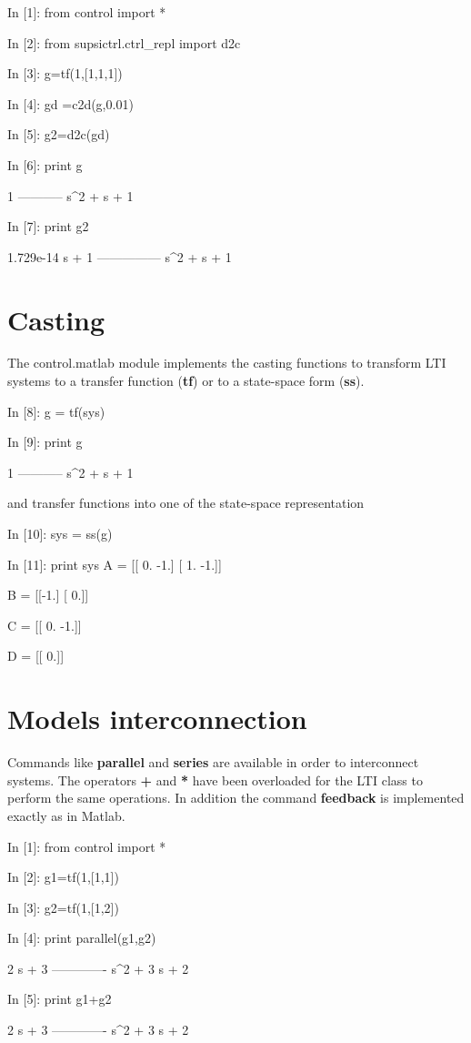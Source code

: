 \begin{code}
In [1]: from control import *

In [2]: from supsictrl.ctrl_repl import d2c

In [3]: g=tf(1,[1,1,1])

In [4]: gd =c2d(g,0.01)

In [5]: g2=d2c(gd)

In [6]: print g

     1
-----------
s^2 + s + 1


In [7]: print g2

1.729e-14 s + 1
---------------
  s^2 + s + 1
\end{code}

\section{Casting}
The control.matlab module implements the casting functions to transform LTI 
systems to a transfer function (\textbf{tf}) or to a state-space form 
(\textbf{ss}).

\begin{code}
In [8]: g = tf(sys)

In [9]: print g

     1
-----------
s^2 + s + 1

\end{code}

and transfer functions into one of the  state-space representation

\begin{code}
In [10]: sys = ss(g)

In [11]: print sys
A = [[ 0. -1.]
 [ 1. -1.]]

B = [[-1.]
 [ 0.]]

C = [[ 0. -1.]]

D = [[ 0.]]

\end{code}
\section{Models interconnection}

Commands like \textbf{parallel} and \textbf{series} are available in order to 
interconnect systems. The operators \textbf{+} and \textbf{*} have been 
overloaded for the LTI class to perform the same operations. In addition the 
command \textbf{feedback} is implemented exactly as in Matlab.

\begin{code}
In [1]: from control import *

In [2]: g1=tf(1,[1,1])

In [3]: g2=tf(1,[1,2])

In [4]: print parallel(g1,g2)

   2 s + 3
-------------
s^2 + 3 s + 2


In [5]: print g1+g2

   2 s + 3
-------------
s^2 + 3 s + 2
\end{code}

